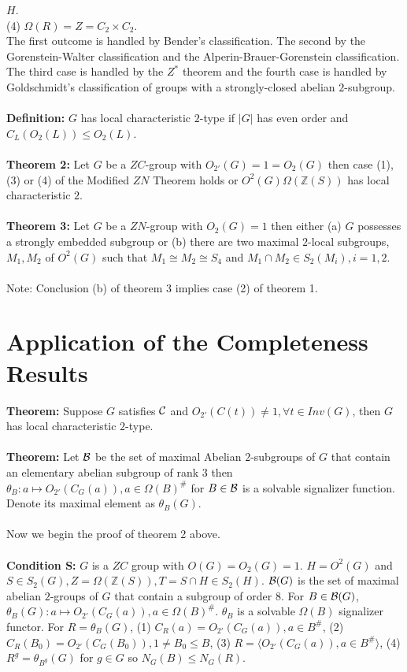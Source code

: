 $H$.\\
(4) $\Omega(R)=Z= C_2 \times C_2$.
\\
The first outcome is handled by Bender's classification.  The second by the Gorenstein-Walter
classification and the Alperin-Brauer-Gorenstein classification.  The third case is handled by the $Z^*$
theorem and the fourth case is handled by Goldschmidt's classification of groups with a strongly-closed
abelian $2$-subgroup.
\\
\\
{\bf Definition:}  $G$ has local characteristic $2$-type if $|G|$ has even order and
$C_L(O_2(L)) \leq O_2(L)$.
\\
\\
{\bf Theorem 2:}  Let $G$ be a $ZC$-group with $O_{2'}(G)=1=O_2(G)$ then case (1), (3) or (4)
of the Modified $ZN$ Theorem holds or $O^2(G) \Omega({\mathbb Z}(S))$ has local characteristic $2$.
\\
\\
{\bf Theorem 3:} Let $G$ be a $ZN$-group with $O_2(G)= 1$ then either (a)
$G$ possesses a strongly embedded subgroup or (b) there are two maximal $2$-local subgroups,
$M_1, M_2$ of $O^2(G)$ such that $M_1 \cong M_2 \cong S_4$ and $M_1 \cap M_2 \in S_2(M_i), i = 1,2$.
\\
\\
Note: Conclusion (b) of theorem 3 implies case (2) of theorem 1.
\section{Application of the Completeness Results}
{\bf Theorem:}  Suppose $G$ satisfies ${\cal C}$ and $O_{2'}(C(t)) \ne 1, \forall t \in Inv(G)$,
then $G$ has local characteristic $2$-type.
\\
\\
{\bf Theorem:} Let ${\cal B}$ be the set of maximal Abelian $2$-subgroups of $G$ that contain
an elementary abelian subgroup of rank $3$ then 
$\theta_B: a \mapsto O_{2'}(C_G(a)), a \in \Omega(B)^{\#}$ for $B \in {\cal B}$ is a solvable
signalizer function.  Denote its maximal element as $\theta_B(G)$.
\\
\\
Now we begin the proof of theorem 2 above.
\\
\\
{\bf Condition {\cal S}:}  $G$ is a $ZC$ group with $O(G)= O_2(G)=1$.
$H=O^2(G)$ and
$S \in S_2(G), Z= \Omega({\mathbb Z}(S)), T= S \cap H \in S_2(H)$. ${\cal B}(G)$ is the set
of maximal abelian $2$-groups of $G$ that contain a subgroup of order $8$.   For $B \in {\cal B}(G)$,
$\theta_B(G): a \mapsto O_{2'}(C_G(a)), a \in \Omega(B)^\#$.  $\theta_B$ is a solvable $\Omega(B)$
signalizer functor.  For $R = \theta_B(G)$, (1) $C_R(a) = O_{2'}(C_G(a)), a \in B^\#$,
(2) $C_R(B_0) = O_{2'}(C_G(B_0)), 1 \neq B_0 \leq B$, (3) $R= \langle O_{2'}(C_G(a)), a \in B^\# \rangle$,
(4) $R^g = \theta_{B^g}(G)$ for $g \in G$ so $N_G(B) \leq N_G(R)$.
\\
\\
